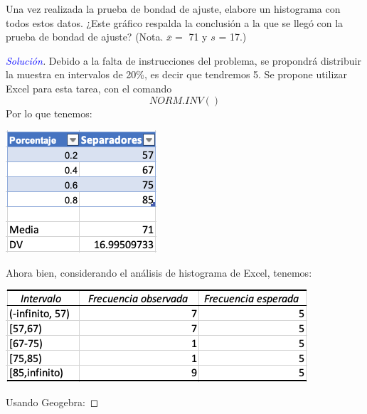 \documentclass[a4paper,12pt]{article}
\newenvironment{solution}
  {\renewcommand\qedsymbol{$\square$}\begin{proof}[\textcolor{blue}{Solución}]}
  {\end{proof}}
\begin{document}
Una vez realizada la prueba de bondad de ajuste, elabore un histograma con todos estos datos. ¿Este gráfico respalda la conclusión a la que se llegó con la prueba de bondad de ajuste? (Nota. $\overline{x}=$ 71 y $s$ = 17.)
\begin{solution}Debido a la falta de instrucciones del problema, se propondrá distribuir la muestra en intervalos de 20\%, es decir que tendremos 5. Se propone utilizar Excel para esta tarea, con el comando
$$NORM.INV()$$
Por lo que tenemos: 
\begin{center}
    \includegraphics[scale=0.4]{images/Screen Shot 2021-05-11 at 14.43.01.png}
\end{center}
Ahora bien, considerando el análisis de histograma de Excel, tenemos: 
\begin{center}
    \includegraphics[scale=0.6]{images/Screen Shot 2021-05-11 at 14.46.58.png}
\end{center}

Usando Geogebra: 


\end{solution}
\end{document}
